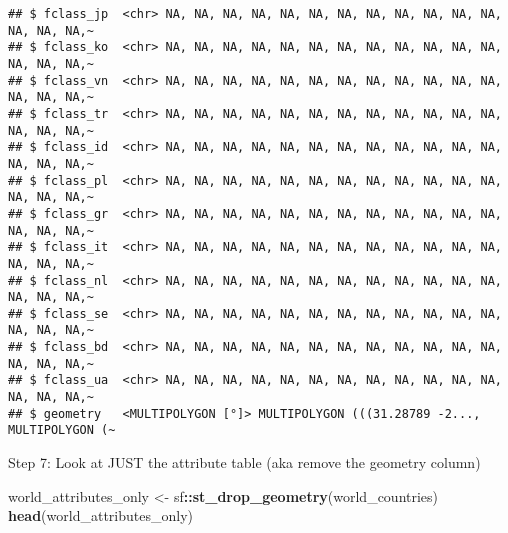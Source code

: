 \documentclass[
]{article}
\newenvironment{Shaded}{\begin{snugshade}}{\end{snugshade}}
\newcommand{\FunctionTok}[1]{\textcolor[rgb]{0.13,0.29,0.53}{\textbf{#1}}}
\newcommand{\NormalTok}[1]{#1}
\newcommand{\OtherTok}[1]{\textcolor[rgb]{0.56,0.35,0.01}{#1}}
\newcommand{\SpecialCharTok}[1]{\textcolor[rgb]{0.81,0.36,0.00}{\textbf{#1}}}
\begin{document}
\begin{verbatim}
## $ fclass_jp  <chr> NA, NA, NA, NA, NA, NA, NA, NA, NA, NA, NA, NA, NA, NA, NA,~
## $ fclass_ko  <chr> NA, NA, NA, NA, NA, NA, NA, NA, NA, NA, NA, NA, NA, NA, NA,~
## $ fclass_vn  <chr> NA, NA, NA, NA, NA, NA, NA, NA, NA, NA, NA, NA, NA, NA, NA,~
## $ fclass_tr  <chr> NA, NA, NA, NA, NA, NA, NA, NA, NA, NA, NA, NA, NA, NA, NA,~
## $ fclass_id  <chr> NA, NA, NA, NA, NA, NA, NA, NA, NA, NA, NA, NA, NA, NA, NA,~
## $ fclass_pl  <chr> NA, NA, NA, NA, NA, NA, NA, NA, NA, NA, NA, NA, NA, NA, NA,~
## $ fclass_gr  <chr> NA, NA, NA, NA, NA, NA, NA, NA, NA, NA, NA, NA, NA, NA, NA,~
## $ fclass_it  <chr> NA, NA, NA, NA, NA, NA, NA, NA, NA, NA, NA, NA, NA, NA, NA,~
## $ fclass_nl  <chr> NA, NA, NA, NA, NA, NA, NA, NA, NA, NA, NA, NA, NA, NA, NA,~
## $ fclass_se  <chr> NA, NA, NA, NA, NA, NA, NA, NA, NA, NA, NA, NA, NA, NA, NA,~
## $ fclass_bd  <chr> NA, NA, NA, NA, NA, NA, NA, NA, NA, NA, NA, NA, NA, NA, NA,~
## $ fclass_ua  <chr> NA, NA, NA, NA, NA, NA, NA, NA, NA, NA, NA, NA, NA, NA, NA,~
## $ geometry   <MULTIPOLYGON [°]> MULTIPOLYGON (((31.28789 -2..., MULTIPOLYGON (~
\end{verbatim}

Step 7: Look at JUST the attribute table (aka remove the geometry
column)

\begin{Shaded}
\begin{Highlighting}[]
\NormalTok{world\_attributes\_only }\OtherTok{\textless{}{-}}\NormalTok{ sf}\SpecialCharTok{::}\FunctionTok{st\_drop\_geometry}\NormalTok{(world\_countries)}
\FunctionTok{head}\NormalTok{(world\_attributes\_only)}
\end{Highlighting}
\end{Shaded}
\end{document}

